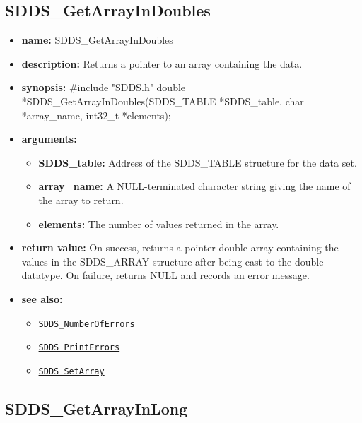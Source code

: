 \documentclass[11pt]{article}
\newcommand{\progref}[1]{\hyperref[SDDS_#1]{\tt SDDS\_#1}}
\begin{document}
\subsection{SDDS\_GetArrayInDoubles}
\label{SDDS_GetArrayInDoubles}

\begin{itemize}
\item {\bf name:}\newline
SDDS\_GetArrayInDoubles
\item {\bf description:}\newline
Returns a pointer to an array containing the data.
\item {\bf synopsis:} \#include "SDDS.h"\newline
double *SDDS\_GetArrayInDoubles(SDDS\_TABLE *SDDS\_table, char *array\_name, int32\_t *elements);\newline
\item {\bf arguments:}
\begin{itemize}
\item {\bf SDDS\_table:} Address of the SDDS\_TABLE structure for the data set.
\item {\bf array\_name:} A NULL-terminated character string giving the name of the array to return.
\item {\bf elements:} The number of values returned in the array.
\end{itemize}
\item {\bf return value:}\newline
On success, returns a pointer double array containing the values in the SDDS\_ARRAY structure after being cast to the double datatype. On failure, returns NULL and records an error message. 
\item {\bf see also:}
\begin{itemize}
\item \progref{NumberOfErrors}
\item \progref{PrintErrors}
\item \progref{SetArray}
\end{itemize}
\end{itemize}

\subsection{SDDS\_GetArrayInLong}
\label{SDDS_GetArrayInLong}
\end{document}
